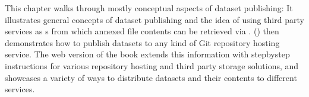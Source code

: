 \sphinxAtStartPar
This chapter walks through mostly conceptual aspects of dataset publishing:
It illustrates general concepts of dataset publishing and the idea of using third party services as {\hyperref[\detokenize{glossary:term-special-remote}]{}}s from
which annexed file contents can be retrieved via .
{\hyperref[\detokenize{basics/101-139-hostingservices:share-hostingservice}]{}} () then demonstrates how to publish datasets to any kind of Git repository hosting service.
The web version of the book extends this information with step\sphinxhyphen{}by\sphinxhyphen{}step instructions for various repository hosting and third party storage solutions, and showcases a variety of ways to distribute datasets and their contents to different services.


